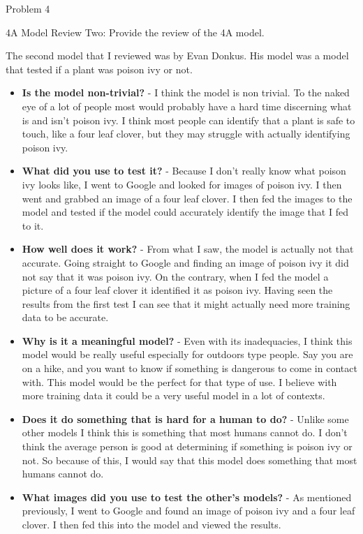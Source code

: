 \begin{problem}{Problem 4}
    \clearpage
    \begin{statement}{4A Model Review Two:}
        Provide the review of the 4A model.
    \end{statement}

    \begin{highlight}[Solution]
            The second model that I reviewed was by Evan Donkus. His model was a model that tested if a plant was poison ivy or not.

        \begin{itemize}
            \item \textbf{Is the model non-trivial?} - I think the model is non trivial. To the naked eye of a lot of people most would probably have a hard time discerning what is and isn't poison
            ivy. I think most people can identify that a plant is safe to touch, like a four leaf clover, but they may struggle with actually identifying poison ivy.
            \item \textbf{What did you use to test it?} - Because I don't really know what poison ivy looks like, I went to Google and looked for images of poison ivy. I then went and grabbed an image
            of a four leaf clover. I then fed the images to the model and tested if the model could accurately identify the image that I fed to it.
            \item \textbf{How well does it work?} - From what I saw, the model is actually not that accurate. Going straight to Google and finding an image of poison ivy it did not say that it was 
            poison ivy. On the contrary, when I fed the model a picture of a four leaf clover it identified it as poison ivy. Having seen the results from the first test I can see that it might actually
            need more training data to be accurate.
            \item \textbf{Why is it a meaningful model?} - Even with its inadequacies, I think this model would be really useful especially for outdoors type people. Say you are on a hike, and you want to
            know if something is dangerous to come in contact with. This model would be the perfect for that type of use. I believe with more training data it could be a very useful model in a lot of
            contexts.
            \item \textbf{Does it do something that is hard for a human to do?} - Unlike some other models I think this is something that most humans cannot do. I don't think the average person is good
            at determining if something is poison ivy or not. So because of this, I would say that this model does something that most humans cannot do.
            \item \textbf{What images did you use to test the other's models?} - As mentioned previously, I went to Google and found an image of poison ivy and a four leaf clover. I then fed this into the
            model and viewed the results.
        \end{itemize}
    \end{highlight}
    

\end{problem}
